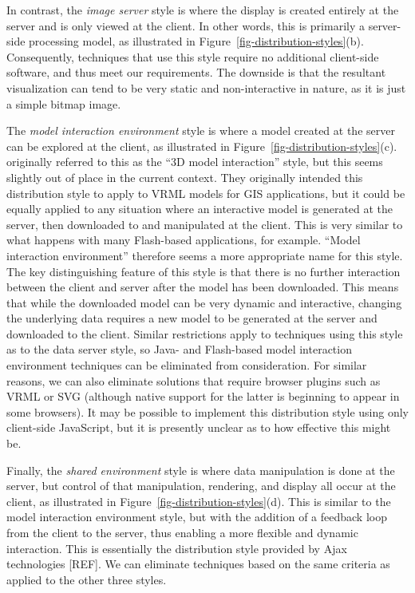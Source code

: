 \documentclass[acmtocl,acmnow]{acmtrans2m}
\begin{document}
In contrast, the \emph{image server} style is where the display is
created entirely at the server and is only viewed at the client. In
other words, this is primarily a server-side processing model, as
illustrated in Figure~\ref{fig-distribution-styles}(b). Consequently,
techniques that use this style require no additional client-side
software, and thus meet our requirements. The downside is that the
resultant visualization can tend to be very static and non-interactive
in nature, as it is just a simple bitmap image.

The \emph{model interaction environment} style is where a model created
at the server can be explored at the client, as illustrated in
Figure~\ref{fig-distribution-styles}(c). 
originally referred to this as the ``3D model interaction'' style, but
this seems slightly out of place in the current context. They originally
intended this distribution style to apply to VRML models for GIS
applications, but it could be equally applied to any situation where an
interactive model is generated at the server, then downloaded to and
manipulated at the client. This is very similar to what happens with
many Flash-based applications, for example. ``Model interaction
environment'' therefore seems a more appropriate name for this style.
The key distinguishing feature of this style is that there is no further
interaction between the client and server after the model has been
downloaded. This means that while the downloaded model can be very
dynamic and interactive, changing the underlying data requires a new
model to be generated at the server and downloaded to the client.
Similar restrictions apply to techniques using this style as to the
data server style, so Java- and Flash-based model interaction
environment techniques can be eliminated from consideration. For similar
reasons, we can also eliminate solutions that require browser plugins
such as VRML or SVG (although native support for the latter is beginning
to appear in some browsers). It may be possible to implement this
distribution style using only client-side JavaScript, but it is presently
unclear as to how effective this might be.


Finally, the \emph{shared environment} style is where data manipulation
is done at the server, but control of that manipulation, rendering, and
display all occur at the client, as illustrated in
Figure~\ref{fig-distribution-styles}(d). This is similar to the model
interaction environment style, but with the addition of a feedback loop
from the client to the server, thus enabling a more flexible and dynamic
interaction. This is essentially the distribution style provided by Ajax
technologies [REF]. We can eliminate techniques based on the same
criteria as applied to the other three styles.
\end{document}
